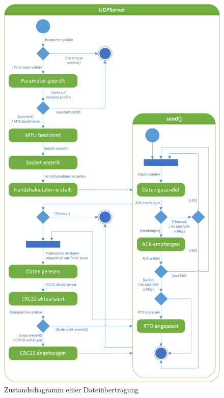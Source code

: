 \begin{figure}
	\centering
	\includegraphics[width=\textwidth,height=\textheight,keepaspectratio]{assets/UDPClient.png}
	\caption{Zustandsdiagramm einer Dateiübertragung}
\end{figure}


